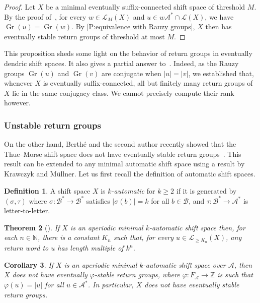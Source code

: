 \documentclass{amsart}
\newcommand*{\nn}{\mathbb{N}}
\newcommand*{\Z}{\mathbb{Z}}
\newcommand*{\lang}{\mathcal{L}}
\newcommand*{\cA}{\mathcal{A}}
\newcommand*{\cB}{\mathcal{B}}
\newcommand*{\from}{\colon}
\newcommand*{\Gr}{\operatorname{Gr}}
\theoremstyle{plain}
\newtheorem{theorem}{Theorem}
\newtheorem{corollary}[theorem]{Corollary}
\theoremstyle{definition}
\newtheorem{definition}[theorem]{Definition}
\theoremstyle{remark}
\begin{document}
\begin{proof}
    Let $X$ be a minimal eventually suffix-connected shift space of threshold $M$. By the proof of~\cite[Proposition~ 5.3]{Goulet-Ouellet2022}, for every $w \in \lang_M(X)$ and $u \in w\cA^* \cap \lang(X)$, we have $\Gr(u) = \Gr(w)$. By \cref{P:equivalence with Rauzy groups}, $X$ then has eventually stable return groups of threshold at most $M$.
\end{proof}


This proposition sheds some light on the behavior of return groups in eventually dendric shift spaces. It also gives a partial answer to~\cite[Question~10.2]{Goulet-Ouellet2022}. Indeed, as the Rauzy groups $\Gr(u)$ and $\Gr(v)$ are conjugate when $|u| = |v|$,  we established that, whenever $X$ is eventually suffix-connected, all but finitely many return groups of $X$ lie in the same conjugacy class. We cannot precisely compute their rank however.

\subsubsection{Unstable return groups}

On the other hand, Berthé and the second author recently showed that the Thue--Morse shift space does not have eventually stable return groups~\cite{Berthe2023}. This result can be extended to any minimal automatic shift space using a result by Krawczyk and Müllner. Let us first recall the definition of automatic shift spaces.

\begin{definition}
    A shift space $X$ is \emph{$k$-automatic} for $k \geq 2$ if it is generated by $(\sigma, \tau)$ where $\sigma\from \cB^* \to \cB^*$ satisfies $|\sigma(b)| = k$ for all $b \in \cB$, and $\tau\from \cB^* \to \cA^*$ is letter-to-letter. 
\end{definition}

\begin{theorem}[{\cite[Theorem 3.2.3]{these_Krawczyk}}]\label{thm:return_words_of_length_kn}
    If $X$ is an aperiodic minimal $k$-automatic shift space then, for each $n \in\nn$, there is a constant $K_n$ such that, for every $u \in \lang_{\geq K_n}(X)$, any return word to $u$ has length multiple of $k^n$.    
\end{theorem}

\begin{corollary}\label{c:automatic}
    If $X$ is an aperiodic minimal $k$-automatic shift space over $\cA$, then $X$ does not have eventually $\varphi$-stable return groups, where $\varphi\from F_\cA \to \Z$ is such that $\varphi(u) = |u|$ for all $u \in \cA^*$. In particular, $X$ does not have eventually stable return groups.
\end{corollary}
\end{document}
